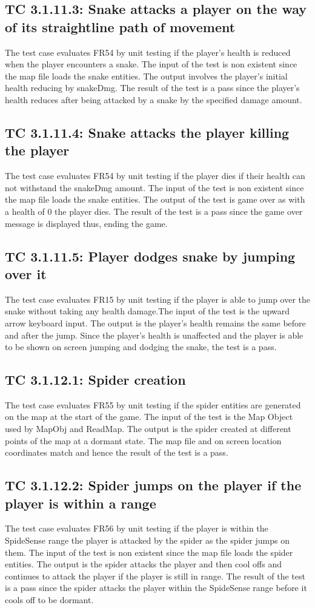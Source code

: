 \documentclass[12pt, titlepage]{article}
\begin{document}
\subsection*{TC 3.1.11.3: Snake attacks a player on the way of its straightline path of movement}
The test case evaluates FR54 by unit testing if the player's health is reduced when the player encounters a snake. The input of the test is non existent since the map file loads the snake entities. The output involves the player's initial health reducing by snakeDmg. The result of the test is a pass since the player's health reduces after being attacked by a snake by the specified damage amount.
\subsection*{TC 3.1.11.4: Snake attacks the player killing the player}
The test case evaluates FR54 by unit testing if the player dies if their health can not withstand the snakeDmg amount. The input of the test is non existent since the map file loads the snake entities. The output of the test is game over as with a health of 0 the player dies. The result of the test is a pass since the game over message is displayed thus, ending the game.  
\subsection*{TC 3.1.11.5: Player dodges snake by jumping over it}
The test case evaluates FR15 by unit testing if the player is able to jump over the snake without taking any health damage.The input of the test is the upward arrow keyboard input. The output is the player's health remains the same before and after the jump. Since the player's health is unaffected and the player is able to be shown on screen jumping and dodging the snake, the test is a pass.
\subsection*{TC 3.1.12.1: Spider creation}
The test case evaluates FR55 by unit testing if the spider entities are generated on the map at the start of the game. The input of the test is the Map Object used by MapObj and ReadMap. The output is the spider created at different points of the map at a dormant state. The map file and on screen location coordinates match and hence the result of the test is a pass.
\subsection*{TC 3.1.12.2: Spider jumps on the player if the player is within a range}
The test case evaluates FR56 by unit testing if the player is within the SpideSense range the player is attacked by the spider as the spider jumps on them. The input of the test is non existent since the map file loads the spider entities. The output is the spider attacks the player and then cool offs and continues to attack the player if the player is still in range. The result of the test is a pass since the spider attacks the player within the SpideSense range before it cools off to be dormant.
\end{document}
